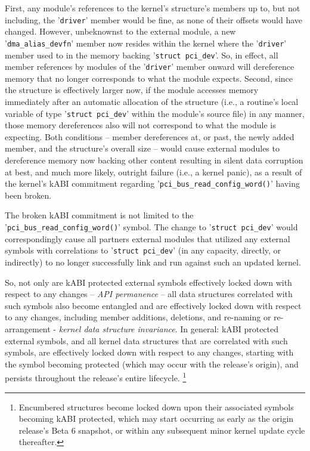 \documentclass[10pt,oneside,english]{book}
\begin{document}
First, any module's references to the kernel's structure's members
up to, but not including, the '\texttt{driver}' member would be fine,
as none of their offsets would have changed. However, unbeknownst
to the external module, a new '\texttt{dma\_alias\_devfn}' member
now resides within the kernel where the '\texttt{driver}' member used
to in the memory backing '\texttt{struct pci\_dev}'. So, in effect,
all member references by modules of the '\texttt{driver}' member onward
will dereference memory that no longer corresponds to what the module
expects. Second, since the structure is effectively larger now, if
the module accesses memory immediately after an automatic allocation
of the structure (i.e., a routine's local variable of type '\texttt{struct
pci\_dev}' within the module's source file) in any manner, those memory
dereferences also will not correspond to what the module is expecting.
Both conditions -- member dereferences at, or past, the newly added
member, and the structure's overall size -- would cause external
modules to dereference memory now backing other content resulting
in silent data corruption at best, and much more likely, outright
failure (i.e., a kernel panic), as a result of the kernel's kABI commitment
regarding '\texttt{pci\_bus\_read\_config\_word()}' having been broken.

The broken kABI commitment is not limited to the '\texttt{pci\_bus\_read\_config\_word()}'
symbol. The change to '\texttt{struct pci\_dev}' would correspondingly
cause all partners external modules that utilized any external symbols
with correlations to '\texttt{struct pci\_dev}' (in any capacity,
directly, or indirectly) to no longer successfully link and run against
such an updated kernel.

So, not only are kABI protected external symbols effectively locked
down with respect to any changes -- \emph{API permanence} -- all
data structures correlated with such symbols also become entangled
and are effectively locked down with respect to any changes, including
member additions, deletions, and re-naming or re-arrangement - \emph{kernel
data structure invariance}. In general: kABI protected external symbols,
and all kernel data structures that are correlated with such symbols,
are effectively locked down with respect to any changes, starting
with the symbol becoming protected (which may occur with the release's
origin), and persists throughout the release's entire lifecycle. \footnote{\label{fn:c3f5}Encumbered structures become locked down upon their
associated symbols becoming kABI protected, which may start occurring
as early as the origin release's Beta 6 snapshot, or within any subsequent
minor kernel update cycle thereafter.}
\end{document}
